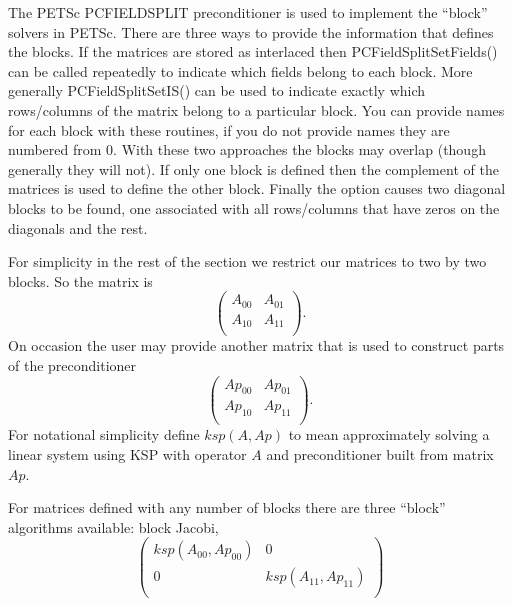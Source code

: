 The PETSc PCFIELDSPLIT preconditioner is used to implement the
``block'' solvers in PETSc. There are three ways to provide the
information that defines the blocks.  If the matrices are stored as
interlaced then PCFieldSplitSetFields() can be called repeatedly to
indicate which fields belong to each block. More generally
PCFieldSplitSetIS() can be used to indicate exactly which rows/columns
of the matrix belong to a particular block. You can provide names for each block with these routines, if you do not provide 
names they are numbered from 0. With these two approaches
the blocks may overlap (though generally they will not). If only one
block is defined then the complement of the matrices is used to define
the other block. Finally the
option 
 causes two diagonal blocks to be found, one associated with all
rows/columns that have zeros on the diagonals and the rest.

For simplicity in the rest of the section we restrict our matrices to two by two blocks. So the matrix is 
\[
\left( \begin{array}{cc}
A_{00}   & A_{01} \\
A_{10}   & A_{11} \\
\end{array} \right).
\]
On occasion the user may provide another matrix that is used to construct parts of the preconditioner
\[
\left( \begin{array}{cc}
Ap_{00}   & Ap_{01} \\
Ap_{10}   & Ap_{11} \\
\end{array} \right).
\]
For notational simplicity define $ ksp(A,Ap) $ to mean approximately solving a linear system using KSP with operator $ A$ and
preconditioner built from matrix $Ap$. 

For matrices defined with any number of blocks there are three ``block'' algorithms available: block Jacobi, 
\[
\left( \begin{array}{cc}
ksp(A_{00},Ap_{00})   & 0 \\
0   & ksp(A_{11},Ap_{11}) \\
\end{array} \right)
\]

